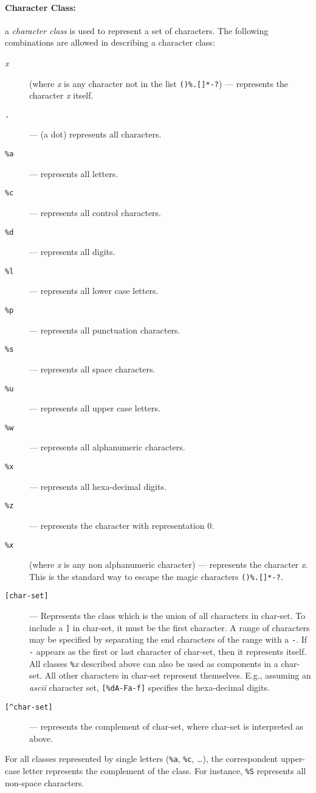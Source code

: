 \documentclass[11pt]{article}
\newcommand{\M}[1]{\emph{#1}}
\newcommand{\T}[1]{{\tt #1}}
\newcommand{\Def}[1]{\emph{#1}\index{#1}}
\begin{document}
\paragraph{Character Class:}
a \Def{character class} is used to represent a set of characters.
The following combinations are allowed in describing a character class:
\begin{description}
\item[\emph{x}] (where \emph{x} is any character not in the list
\verb|()%.[]*-?|)
--- represents the character \emph{x} itself.
\item[\T{.}] --- (a dot) represents all characters.
\item[\T{\%a}] --- represents all letters.
\item[\T{\%c}] --- represents all control characters.
\item[\T{\%d}] --- represents all digits.
\item[\T{\%l}] --- represents all lower case letters.
\item[\T{\%p}] --- represents all punctuation characters.
\item[\T{\%s}] --- represents all space characters.
\item[\T{\%u}] --- represents all upper case letters.
\item[\T{\%w}] --- represents all alphanumeric characters.
\item[\T{\%x}] --- represents all hexa-decimal digits.
\item[\T{\%z}] --- represents the character with representation 0.
\item[\T{\%\M{x}}] (where \M{x} is any non alphanumeric character)  ---
represents the character \M{x}.
This is the standard way to escape the magic characters \verb|()%.[]*-?|.
\item[\T{[char-set]}] ---
Represents the class which is the union of all
characters in char-set.
To include a \verb|]| in char-set, it must be the first character.
A range of characters may be specified by
separating the end characters of the range with a \verb|-|.
If \verb|-| appears as the first or last character of char-set,
then it represents itself.
All classes \verb|%|\emph{x} described above can also be used as
components in a char-set.
All other characters in char-set represent themselves.
E.g., assuming an \emph{ascii} character set,
\verb|[%dA-Fa-f]| specifies the hexa-decimal digits.
\item[\T{[\^{ }char-set]}] ---
represents the complement of char-set,
where char-set is interpreted as above.
\end{description}
For all classes represented by single letters (\verb|%a|, \verb|%c|, \ldots),
the correspondent upper-case letter represents the complement of the class.
For instance, \verb|%S| represents all non-space characters.
\end{document}
